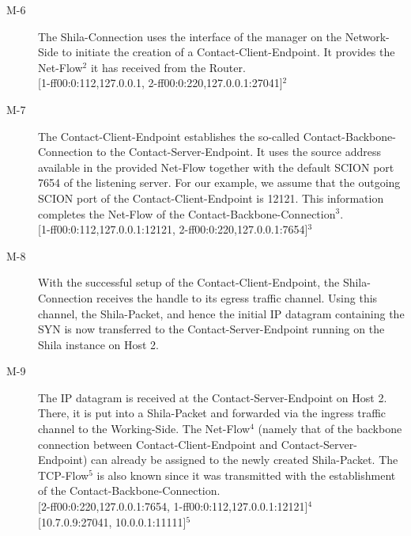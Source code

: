 \begin{description}
	\item[M-6] The Shila-Connection uses the interface of the manager on the Network-Side to initiate the creation of a Contact-Client-Endpoint. It provides the Net-Flow$^2$ it has received from the Router.\medskip\\{\footnotesize[1-ff00:0:112,127.0.0.1, 2-ff00:0:220,127.0.0.1:27041]$^2$}
	\item[M-7] The Contact-Client-Endpoint establishes the so-called Contact-Backbone-Connection to the Contact-Server-Endpoint. It uses the source address available in the provided Net-Flow together with the default SCION port {\footnotesize 7654} of the listening server. For our example, we assume that the outgoing SCION port of the Contact-Client-Endpoint is {\footnotesize 12121}. This information completes the Net-Flow of the Contact-Backbone-Connection$^{3}$.\medskip\\{\footnotesize [1-ff00:0:112,127.0.0.1:12121, 2-ff00:0:220,127.0.0.1:7654]$^{3}$}
%	
%	
	\item[M-8] With the successful setup of the Contact-Client-Endpoint, the Shila-Connection receives the handle to its egress traffic channel. Using this channel, the Shila-Packet, and hence the initial IP datagram containing the SYN is now transferred to the Contact-Server-Endpoint running on the Shila instance on Host 2. %
	\item[M-9] The IP datagram is received at the Contact-Server-Endpoint on Host 2. There, it is put into a Shila-Packet and forwarded via the ingress traffic channel to the Working-Side. The Net-Flow$^{4}$ (namely that of the backbone connection between Contact-Client-Endpoint and Contact-Server-Endpoint) can already be assigned to the newly created Shila-Packet. The TCP-Flow$^{5}$ is also known since it was transmitted with the establishment of the Contact-Backbone-Connection.\medskip\\{\footnotesize [2-ff00:0:220,127.0.0.1:7654, 1-ff00:0:112,127.0.0.1:12121]$^{4}$}\\{\footnotesize [10.7.0.9:27041, 10.0.0.1:11111]$^{5}$} 

\end{description}
